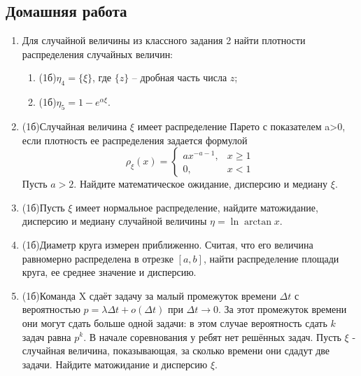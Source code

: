 \documentclass[a4paper, 14pt]{extarticle}
\begin{document}
\subsection*{Домашняя работа}
\begin{enumerate}
\item Для случайной величины из классного задания 2 найти плотности распределения случайных величин:
	\begin{enumerate}
		\item (1б)$\eta_4=\{\xi\}$, где $\{z\}$ -- дробная часть числа $z$; 
		\item (1б)$\eta_5=1-e^{\alpha\xi}$.
	\end{enumerate}
\item (1б)Случайная величина $\xi$ имеет распределение Парето с показателем a>0, если плотность ее распределения задается формулой
$$\rho_\xi(x) =\left\{
	\begin{array}{cc}
	ax^{-a-1}, & x\geq 1 \\
	0, & x<1
	\end{array}\right.$$
Пусть $a>2$. Найдите математическое ожидание, дисперсию и медиану $\xi$.
\item (1б)Пусть $\xi$ имеет нормальное распределение, найдите матожидание, дисперсию и медиану случайной величины $\eta = \ln \arctan x$.
\item (1б)Диаметр круга измерен приближенно. Считая, что
	его величина равномерно распределена в отрезке $[a,b]$, найти
	распределение площади круга, ее среднее значение и дисперсию.
	\item (1б)Команда X сдаёт задачу за малый промежуток времени $\Delta t$ с вероятностью $p = \lambda \Delta t + o(\Delta t)$ при $\Delta t \to 0$. За этот промежуток времени они могут сдать больше одной задачи: в этом случае вероятность сдать $k$ задач равна $p^k$. В начале соревнования у ребят нет решённых задач. Пусть $\xi$ - случайная величина, показывающая, за сколько времени они сдадут две задачи. Найдите матожидание и дисперсию $\xi$.
\end{enumerate}	
\end{document}
